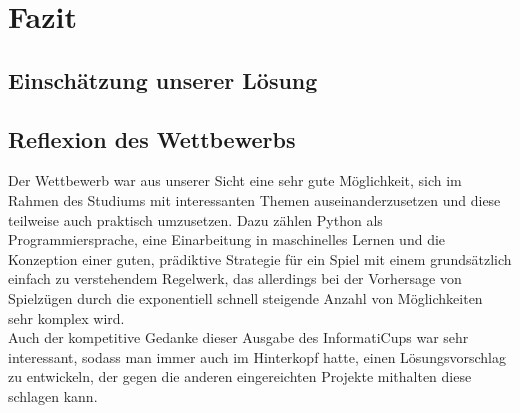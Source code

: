 \chapter{Fazit}
\label{ch:fazit}

\section{Einschätzung unserer Lösung}
\label{sec:einschaetzuung}


\section{Reflexion des Wettbewerbs}
\label{sec:reflexion}

Der Wettbewerb war aus unserer Sicht eine sehr gute Möglichkeit, sich im Rahmen des Studiums mit interessanten Themen
auseinanderzusetzen und diese teilweise auch praktisch umzusetzen.
Dazu zählen \ua Python als Programmiersprache, eine Einarbeitung in maschinelles Lernen und die Konzeption einer
guten, prädiktive Strategie für ein Spiel mit einem grundsätzlich einfach zu verstehendem Regelwerk, das allerdings
bei der Vorhersage von Spielzügen durch die exponentiell schnell steigende Anzahl von Möglichkeiten sehr komplex wird.
\\

Auch der kompetitive Gedanke dieser Ausgabe des InformatiCups war sehr interessant, sodass man immer auch im
Hinterkopf hatte, einen Lösungsvorschlag zu entwickeln, der gegen die anderen eingereichten Projekte mithalten \bzw
diese schlagen kann.
